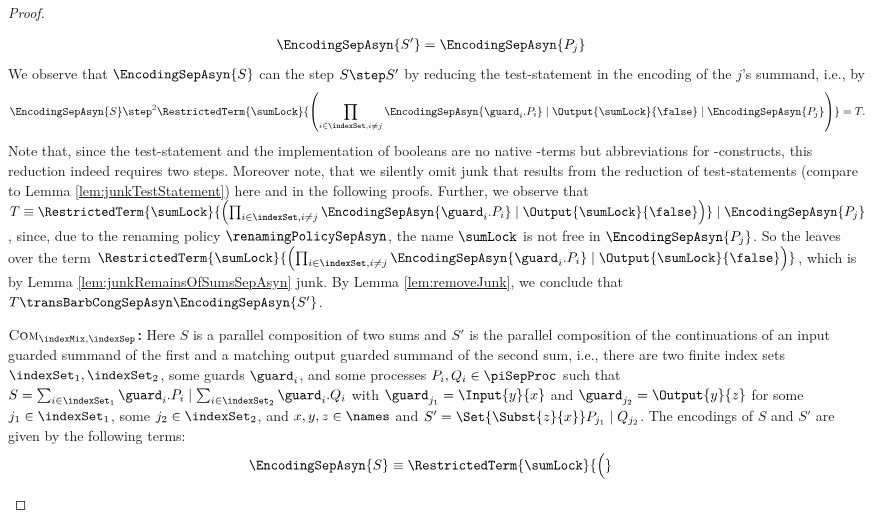 \documentclass[]{llncs}
\begin{document}
\begin{proof}
\begin{description}
\begin{description}
\begin{align*}
						\EncodingSepAsyn{S'} & = \EncodingSepAsyn{P_j}
					\end{align*}
					We observe that $ \EncodingSepAsyn{S} $ can \simulate the step $ S \step S' $ by reducing the test-statement in the encoding of the $ j $'s summand, i.e., by
					\begin{align*}
						\EncodingSepAsyn{S} \step^2 \RestrictedTerm{\sumLock}{\left( \prod_{i \in \indexSet, i \neq j} \EncodingSepAsyn{\guard_i.P_i} \mid \Output{\sumLock}{\false} \mid \EncodingSepAsyn{P_j} \right)} = T.
					\end{align*}
					Note that, since the test-statement and the implementation of booleans are no native \piCal-terms but abbreviations for \piCal-constructs, this reduction indeed requires two steps. Moreover note, that we silently omit junk that results from the reduction of test-statements (compare to Lemma \ref{lem:junkTestStatement}) here and in the following proofs. Further, we observe that $ T \equiv \RestrictedTerm{\sumLock}{\left( \prod_{i \in \indexSet, i \neq j} \EncodingSepAsyn{\guard_i.P_i} \mid \Output{\sumLock}{\false} \right)} \mid \EncodingSepAsyn{P_j} $, since, due to the renaming policy $ \renamingPolicySepAsyn $, the name $ \sumLock $ is not free in $ \EncodingSepAsyn{P_j} $. So the \simulation leaves over the term $ \RestrictedTerm{\sumLock}{\left( \prod_{i \in \indexSet, i \neq j} \EncodingSepAsyn{\guard_i.P_i} \mid \Output{\sumLock}{\false} \right)} $, which is by Lemma \ref{lem:junkRemainsOfSumsSepAsyn} junk. By Lemma \ref{lem:removeJunk}, we conclude that $ T \transBarbCongSepAsyn \EncodingSepAsyn{S'} $.
				\item[Case of Rule] $ \textsc{Com}_{\indexMix, \indexSep} $\textbf{:} Here $ S $ is a parallel composition of two sums and $ S' $ is the parallel composition of the continuations of an input guarded summand of the first and a matching output guarded summand of the second sum, i.e., there are two finite index sets $ \indexSet_1, \indexSet_2 $, some guards $ \guard_i $, and some processes $ P_i, Q_i \in \piSepProc $ such that $ S = \sum_{i \in \indexSet_1} \guard_i.P_i \mid \sum_{i \in \indexSet_2} \guard_i.Q_i $ with $ \guard_{j_1} = \Input{y}{x} $ and $ \guard_{j_2} = \Output{y}{z} $ for some $ j_1 \in \indexSet_1 $, some $ j_2 \in \indexSet_2 $, and $ x, y, z \in \names $ and $ S' = \Set{ \Subst{z}{x} } P_{j_1} \mid Q_{j_2} $. The encodings of $ S $ and $ S' $ are given by the following terms:
					\begin{align*}
						\EncodingSepAsyn{S} & \equiv \RestrictedTerm{\sumLock}{\Big( \begin{aligned}[t]

\end{aligned}}
\end{align*}
\end{description}
\end{description}
\end{proof}
\end{document}

